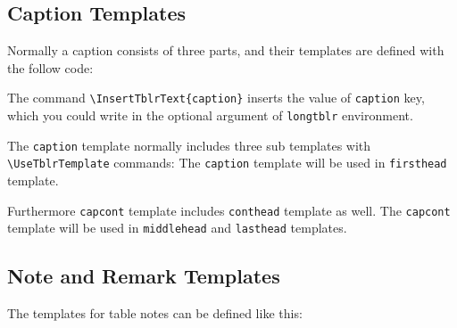 \documentclass[oneside]{book}
\begin{document}
\subsection{Caption Templates}

Normally a caption consists of three parts, and their templates are defined with the follow code:

\begin{codehigh}
\end{codehigh}

The command \verb!\InsertTblrText{caption}! inserts the value of \verb!caption! key,
which you could write in the optional argument of \verb!longtblr! environment.

The \verb!caption! template normally includes three sub templates with \verb!\UseTblrTemplate! commands:
The \verb!caption! template will be used in \verb!firsthead! template.

\begin{codehigh}
\end{codehigh}

Furthermore \verb!capcont! template includes \verb!conthead! template as well.
The \verb!capcont! template will be used in \verb!middlehead! and \verb!lasthead! templates.

\begin{codehigh}
\end{codehigh}

\subsection{Note and Remark Templates}

The templates for table notes can be defined like this:

\begin{codehigh}
\end{codehigh}
\begin{codehigh}
\end{codehigh}
\end{document}
